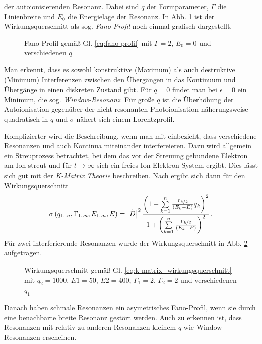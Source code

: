 der autoionisierenden Resonanz. Dabei sind $q$ der Formparameter, $\Gamma$ die
Linienbreite und $E_0$ die Energielage der Resonanz. In Abb. \ref{fig:fano} ist
der Wirkungsquerschnitt als sog. \textit{Fano-Profil} noch einmal grafisch
dargestellt.
\begin{figure}
	\centering
	\footnotesize
	
	\caption[Fano-Profil]{Fano-Profil gemäß Gl. \eqref{eq:fano-profil} mit
	$\Gamma=2$, $E_0=0$ und verschiedenen $q$}\label{fig:fano}
\end{figure}
Man erkennt, dass es sowohl konstruktive (Maximum) als auch destruktive
(Minimum) Interferenzen zwischen den Übergängen in das Kontinuum und Übergänge
in einen diskreten Zustand gibt. Für $q=0$ findet man bei $\epsilon=0$ ein
Minimum, die sog. \textit{Window-Resonanz}. Für große $q$ ist die Überhöhung der
Autoionisation gegenüber der nicht-resonanten Photoionisation näherungsweise
quadratisch in $q$ und $\sigma$ nähert sich einem Lorentzprofil.\par
Komplizierter wird die Beschreibung, wenn man mit einbezieht, dass verschiedene
Resonanzen und auch Kontinua miteinander interfereieren. Dazu wird allgemein ein
Streuprozess betrachtet, bei dem das vor der Streuung gebundene Elektron am
Ion streut und für $t\to\infty$ sich ein freies Ion-Elektron-System ergibt. Dies
lässt sich gut mit der \textit{K-Matrix Theorie} beschreiben. Nach
\cite{connerade:1998:highly_excited_atoms} ergibt sich dann für den
Wirkungsquerschnitt
\begin{equation}\label{eq:k-matrix_wirkungsquerschnitt}
	\sigma\left(q_{1..n},\Gamma_{1..n},E_{1..n},E\right)=\left|\tilde{D}\right|^2\frac{\left(1+\sum\limits_{k=1}^n{\frac{\nicefrac{\Gamma_k}{2}}{\left(E_k-E\right)}q_k}\right)^2}{1+\left(\sum\limits_{k=1}^n{\frac{\nicefrac{\Gamma_k}{2}}{\left(E_k-E\right)}}\right)^2}\,.
\end{equation}
Für zwei interferierende Resonanzen wurde der Wirkungsquerschnitt in Abb.
\ref{fig:k-matrix_wirkungsquerschnitt} aufgetragen.
\begin{figure}
	\centering
	\footnotesize
	
	\caption[Wirkuungsquerschnitt - K-Matrix Theorie]{Wirkungsquerschnitt gemäß Gl.
	\eqref{eq:k-matrix_wirkungsquerschnitt} mit $q_2=1000$, $E1=50$, $E2=400$, $\Gamma_1=2$, $\Gamma_2=2$ und
	verschiedenen $q_1$}\label{fig:k-matrix_wirkungsquerschnitt}
\end{figure}
Danach haben schmale Resonanzen ein asymetrisches Fano-Profil, wenn sie durch
eine benachbarte breite Resonanz gestört werden. Auch zu erkennen ist, dass
Resonanzen mit relativ zu anderen Resonanzen kleinem $q$ wie Window-Resonanzen
erscheinen.

